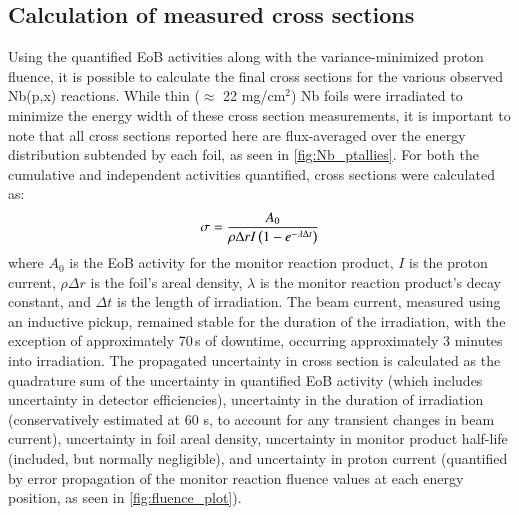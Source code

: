 




\subsection{Calculation of measured cross sections}\label{sec:calcs_sec}


Using the quantified EoB activities along with the variance-minimized proton fluence, it is possible to calculate the final cross sections for the various observed Nb(p,x) reactions.
While thin ($\approx$ 22 mg/cm$^2$) Nb foils were irradiated to minimize the energy width of these cross section measurements, it is important to note that all cross sections reported here are flux-averaged  
over the energy distribution subtended by each foil, as seen in \autoref{fig:Nb_ptallies}.
For both the cumulative and independent activities quantified, cross sections were calculated as:
\begin{equation}
\sigma = \dfrac{A_0 }{\rho \Delta r I \left( 1-e^{-\lambda \Delta t}\right) }
\end{equation}
where $A_0$ is the EoB activity for the monitor reaction product, $I$ is the proton current, $\rho \Delta r$ is the foil's areal density, $\lambda$ is the monitor reaction product's decay constant, and $\Delta t$ is the length of irradiation.
The beam current, measured using an inductive pickup, remained stable for the duration of the irradiation, with the exception of approximately 70\,s of downtime,  occurring approximately 3 minutes into irradiation.
The propagated uncertainty in cross section is calculated as the quadrature sum of the uncertainty in quantified EoB activity (which includes uncertainty in detector efficiencies), uncertainty in the duration of irradiation (conservatively estimated at 60 s, to account for any transient changes in beam current), uncertainty in foil areal density, uncertainty in monitor product half-life (included, but normally negligible),  and uncertainty in proton current (quantified by error propagation of the monitor reaction fluence values  at each energy position, as seen in \autoref{fig:fluence_plot}).






